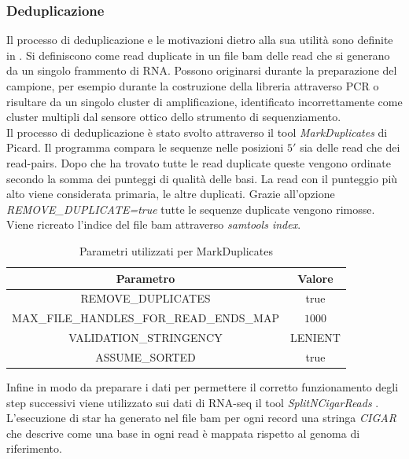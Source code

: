     \subsubsection{Deduplicazione}
    Il processo di deduplicazione e le motivazioni dietro alla sua utilit\`a sono definite in \cite{dedup}.
    Si definiscono come read duplicate in un file bam delle read che si generano da un singolo frammento di RNA.
    Possono originarsi durante la preparazione del campione, per esempio durante la costruzione della libreria attraverso PCR o risultare da un singolo cluster di amplificazione, identificato incorrettamente come cluster multipli dal sensore ottico dello strumento di sequenziamento.\\
    Il processo di deduplicazione \`e stato svolto attraverso il tool \emph{MarkDuplicates} di Picard.
    Il programma compara le sequenze nelle posizioni $5'$ sia delle read che dei read-pairs.
    Dopo che ha trovato tutte le read duplicate queste vengono ordinate secondo la somma dei punteggi di qualit\`a delle basi.
    La read con il punteggio pi\`u alto viene considerata primaria, le altre duplicati.
    Grazie all'opzione \emph{REMOVE\_DUPLICATE=true} tutte le sequenze duplicate vengono rimosse.
    Viene ricreato l'indice del file bam attraverso \emph{samtools index}.
    \begin{table}[H]
        \centering
        \begin{tabular}{|c|c|}
                \hline
                Parametro & Valore\\
                \hline
                REMOVE\_DUPLICATES & true\\
                \hline
                MAX\_FILE\_HANDLES\_FOR\_READ\_ENDS\_MAP & $1000$\\
                \hline
                VALIDATION\_STRINGENCY & LENIENT\\
                \hline
                ASSUME\_SORTED & true\\
                \hline
         \end{tabular}
         \caption{Parametri utilizzati per MarkDuplicates}
    \end{table}
    Infine in modo da preparare i dati per permettere il corretto funzionamento degli step successivi viene utilizzato sui dati di RNA-seq il tool \emph{SplitNCigarReads} \cite{splitncigarreads}.
    L'esecuzione di star ha generato nel file bam per ogni record una stringa  \emph{CIGAR} che descrive come una base in ogni read \`e mappata rispetto al genoma di riferimento.
